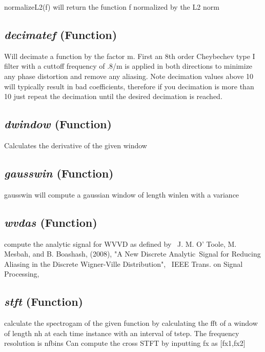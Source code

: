 normalizeL2(f) will return the function f normalized by the L2 norm 

\subsection{\textit{decimatef} (Function)}
\label{ssec:processing.tftools.decimatef}

Will decimate a function by the factor m. First an 8th order Cheybechev 
    type I filter with a cuttoff frequency of .8/m  is applied in both 
    directions to minimize any phase distortion and remove any aliasing. Note 
    decimation values above 10 will typically result in bad coefficients, 
    therefore if you decimation is more than 10 just repeat the decimation until
    the desired decimation is reached.

\subsection{\textit{dwindow} (Function)}
\label{ssec:processing.tftools.dwindow}

Calculates the derivative of the given window

\subsection{\textit{gausswin} (Function)}
\label{ssec:processing.tftools.gausswin}

gausswin will compute a gaussian window of length winlen with a variance

\subsection{\textit{wvdas} (Function)}
\label{ssec:processing.tftools.wvdas}

compute the analytic signal for WVVD as defined by \
    J. M. O' Toole, M. Mesbah, and B. Boashash, (2008), "A New Discrete Analytic\
    Signal for Reducing Aliasing in the Discrete Wigner-Ville Distribution", \
    IEEE Trans.  on Signal Processing,

\subsection{\textit{stft} (Function)}
\label{ssec:processing.tftools.stft}

calculate the spectrogam of
    the given function by calculating the fft of a window of length nh at each
    time instance with an interval of tstep.  The frequency resolution is nfbins
    Can compute the cross STFT by inputting fx as [fx1,fx2]


